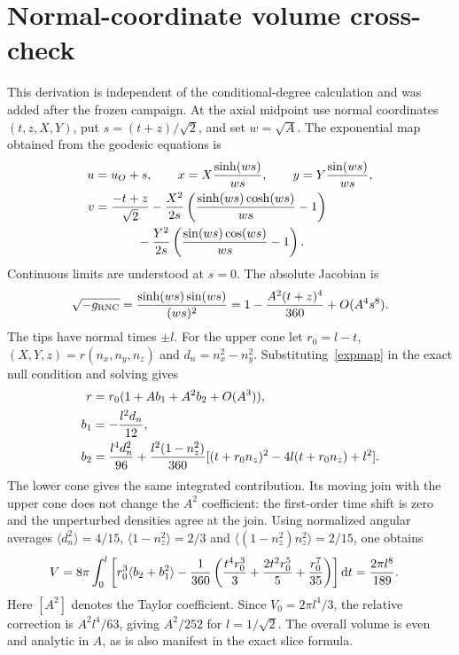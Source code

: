 \documentclass[11pt,a4paper]{article}
\newcommand{\dd}{\mathrm d}
\begin{document}
\section{Normal-coordinate volume cross-check}\label{rnc}
This derivation is independent of the conditional-degree calculation and was
added after the frozen campaign. At the axial midpoint use normal coordinates
$(t,z,X,Y)$, put $s=(t+z)/\sqrt2$, and set $w=\sqrt A$.
The exponential map obtained from the geodesic equations is
\begin{align}
 u&=u_O+s,\qquad
 x=X{\sinh(ws)\over ws},\qquad y=Y{\sin(ws)\over ws},\nonumber\\
 v&={-t+z\over\sqrt2}
 -{X^2\over2s}\left({\sinh(ws)\cosh(ws)\over ws}-1\right)\nonumber\\
 &\hspace{12mm}
 -{Y^2\over2s}\left({\sin(ws)\cos(ws)\over ws}-1\right). \label{expmap}
\end{align}
Continuous limits are understood at $s=0$. The absolute Jacobian is
\begin{equation}
 \sqrt{-g_{\rm RNC}}={\sinh(ws)\sin(ws)\over (ws)^2}
 =1-{A^2(t+z)^4\over360}+O(A^4s^8). \label{rncjac}
\end{equation}
The tips have normal times $\pm l$. For the upper cone let $r_0=l-t$,
$(X,Y,z)=r(n_x,n_y,n_z)$ and $d_n=n_x^2-n_y^2$.
Substituting~\eqref{expmap} in the exact null condition and solving gives
\begin{align}
 r&=r_0(1+Ab_1+A^2b_2+O(A^3)),\nonumber\\
 b_1&=-{l^2d_n\over12},\nonumber\\
 b_2&={l^4d_n^2\over96}
 +{l^2(1-n_z^2)\over360}
       [(t+r_0n_z)^2-4l(t+r_0n_z)+l^2]. \label{rncboundary}
\end{align}
The lower cone gives the same integrated contribution. Its moving join with
the upper cone does not change the $A^2$ coefficient: the first-order time
shift is zero and the unperturbed densities agree at the join.
Using normalized angular averages
$\langle d_n^2\rangle=4/15$,
$\langle1-n_z^2\rangle=2/3$ and
$\langle(1-n_z^2)n_z^2\rangle=2/15$, one obtains
\begin{align}
 [A^2]V={}&8\pi\int_0^l\left[
 r_0^3\langle b_2+b_1^2\rangle
 -{1\over360}\left({t^4r_0^3\over3}
                   +{2t^2r_0^5\over5}+{r_0^7\over35}\right)\right]\dd t
 ={2\pi l^8\over189}. \label{rncvolume}
\end{align}
Here $[A^2]$ denotes the Taylor coefficient. Since $V_0=2\pi l^4/3$,
the relative correction is $A^2l^4/63$, giving $A^2/252$ for $l=1/\sqrt2$.
The overall volume is even and analytic in $A$, as is also manifest in the
exact slice formula.
\end{document}
